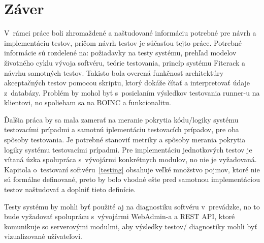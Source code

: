 \chapter{Záver}
V~rámci práce boli zhromaždené a naštudované informáciu potrebné pre návrh a implementáciu testov, pričom návrh testov je súčasťou tejto práce.
Potrebné informácie sú rozdelené na: požiadavky na testy systému, prehľad modelov životného cyklu vývoja softvéru, teórie testovania, princíp systému Fitcrack a návrhu samotných testov.
Takisto bola overená funkčnosť architektúry akceptačných testov pomocou skriptu, ktorý dokáže čítať a interpretovať údaje z~databázy.
Problém by mohol byť s~posielaním výsledkov testovania runner-u na klientovi, no spolieham sa na BOINC a funkcionalitu.

Ďalšia práca by sa mala zamerať na meranie pokrytia kódu/logiky systému testovacími prípadmi a samotnú iplementáciu testovacích prípadov, pre oba spôsoby testovania.
Je potrebné stanoviť metriky a spôsoby merania pokrytia logiky systému testovacími prípadmi.
Pre implementáciu jednotkových testov je vítaná úzka spolupráca s~vývojármi konkrétnych modulov, no nie je vyžadovaná.
Kapitola o~testovaní softvéru~\ref{testing} obsahuje veľké množstvo pojmov, ktoré nie sú formálne definované, preto by bolo vhodné ešte pred samotnou implementáciou testov naštudovať a doplniť tieto definície.

Testy systému by mohli byť použité aj na diagnostiku softvéru v~prevádzke, no to bude vyžadovať spoluprácu s~vývojármi WebAdmin-a a REST API, ktoré komunikuje so serverovými modulmi, aby výsledky testov/ diagnostiky mohli byť vizualizované užívateľovi.
